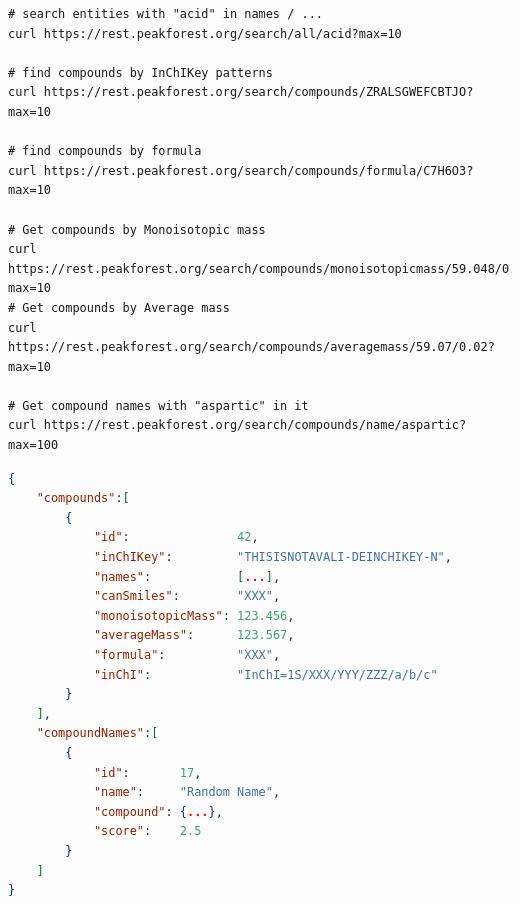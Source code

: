 	\begin{lstlisting}[language=custombash,caption={Search Demo},label=searchDemo]
# search entities with "acid" in names / ...
curl https://rest.peakforest.org/search/all/acid?max=10

# find compounds by InChIKey patterns
curl https://rest.peakforest.org/search/compounds/ZRALSGWEFCBTJO?max=10

# find compounds by formula
curl https://rest.peakforest.org/search/compounds/formula/C7H6O3?max=10

# Get compounds by Monoisotopic mass
curl https://rest.peakforest.org/search/compounds/monoisotopicmass/59.048/0.02?max=10
# Get compounds by Average mass
curl https://rest.peakforest.org/search/compounds/averagemass/59.07/0.02?max=10

# Get compound names with "aspartic" in it
curl https://rest.peakforest.org/search/compounds/name/aspartic?max=100
	\end{lstlisting}
	\begin{lstlisting}[language=json,caption={Search results format},label=searchResult]
{
	"compounds":[
		{
			"id":               42,
			"inChIKey":         "THISISNOTAVALI-DEINCHIKEY-N",
			"names":            [...],
			"canSmiles":        "XXX",
			"monoisotopicMass": 123.456,
			"averageMass":      123.567,
			"formula":          "XXX",
			"inChI":            "InChI=1S/XXX/YYY/ZZZ/a/b/c"	
		}
	],
	"compoundNames":[
		{
			"id":       17,
			"name":     "Random Name",	
			"compound": {...},			
			"score":    2.5
		}
	]
}
	\end{lstlisting}

